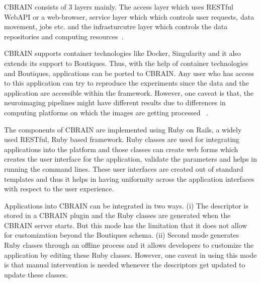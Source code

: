 
CBRAIN consists of 3 layers mainly. The access layer which uses RESTful WebAPI or a web-browser, service layer which which controls user requests, data movement, jobs etc. and the infrasturcutre layer which controls the data repositories and computing resources~\cite{DBLP:journals/fini/DasGRSPMSRSKMKR17}.

CBRAIN supports container technologies like Docker, Singularity and it 
also extends its support to Boutiques. Thus, with the help of container 
technologies and Boutiques, applications can be ported to CBRAIN. Any 
user who has access to this application can try to reproduce the 
experiments since the data and the application are accessible within 
the framework. However, one caveat is that, the neuroimaging pipelines 
might have different results due to differences in computing platforms 
on which the images are getting processed 
~\cite{10.3389/conf.fninf.2014.18.00076}.

The components of CBRAIN are implemented using Ruby on Rails, a widely 
used RESTful, Ruby based framework. Ruby classes are used for 
integrating applications into the platform and those classes can create 
web forms which creates the user interface for the application, 
validate the parameters and helps in running the command lines. These 
user interfaces are created out of standard templates and thus it helps 
in having uniformity across the application interfaces with respect to 
the user experience.

Applications into CBRAIN can be integrated in two ways. (i) The 
descriptor is stored in a CBRAIN plugin and the Ruby classes are 
generated when the CBRAIN server starts. But this mode has the 
limitation that it does not allow for customization beyond the 
Boutiques schema. (ii) Second mode generates Ruby classes through an 
offline process and it allows developers to customize the application 
by editing these Ruby classes. However, one caveat in using this mode 
is that manual intervention is needed whenever the descriptors get 
updated to update these classes.

